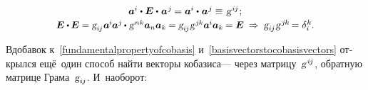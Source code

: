 \begin{otherlanguage}{russian}
\begin{equation}
\begin{array}{c}
\bm{a}^{\hspace{-0.05ex}i} \dotp \UnitDyad \dotp \hspace{.1ex} \bm{a}^{\hspace{.1ex}j} \hspace{-0.15ex} = \bm{a}^{\hspace{-0.05ex}i} \dotp \hspace{.1ex} \bm{a}^{\hspace{.1ex}j} \hspace{-0.15ex} \hspace{.1ex} \equiv \hspace{.16ex} \textsl{g}^{\hspace{0.2ex}i\hspace{-0.1ex}j} \hspace{.1ex} ;
\\[0.2em]
%
\scalebox{0.96}[0.97]{$\UnitDyad \dotp \hspace{-0.1ex} \UnitDyad = \textsl{g}_{i\hspace{-0.1ex}j} \hspace{.1ex} \bm{a}^{\hspace{-0.05ex}i} \hspace{-0.1ex} \bm{a}^{\hspace{0.05ex}j} \hspace{-0.1ex} \dotp \hspace{.1ex} \textsl{g}^{\hspace{0.2ex}nk} \bm{a}_n \bm{a}_k \hspace{-0.1ex} = \textsl{g}_{i\hspace{-0.1ex}j} \hspace{.1ex} \textsl{g}^{\hspace{0.2ex}j\hspace{-0.1ex}k} \bm{a}^{\hspace{-0.05ex}i} \bm{a}_k \hspace{-0.1ex} = \UnitDyad$}
\:\Rightarrow\: \textsl{g}_{i\hspace{-0.1ex}j} \hspace{.1ex} \textsl{g}^{\hspace{.2ex}j\hspace{-0.1ex}k} \hspace{-0.25ex} = \delta_i^{\hspace{0.05ex}k} \hspace{-0.1ex}.
\end{array}\end{equation}

\vspace{.1em}\noindent
Вдобавок к~\eqref{fundamentalpropertyofcobasis} и~\eqref{basisvectorstocobasisvectors} открылся ещё~один способ найти векторы кобазиса\:--- через матрицу~\hbox{$\textsl{g}^{\hspace{.2ex}i\hspace{-0.1ex}j}$\hspace{-0.3ex}}, обратную матрице Грама~${\textsl{g}_{i\hspace{-0.1ex}j}}$.
И~наоборот:


\end{otherlanguage}

